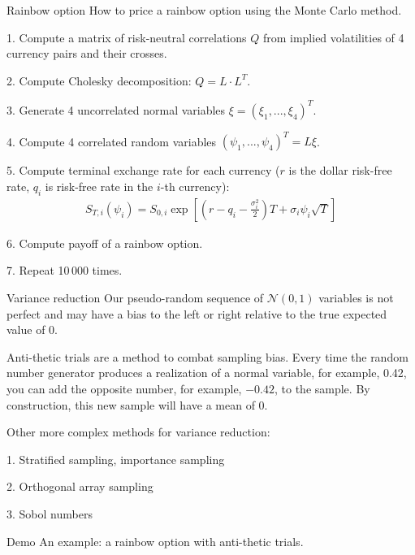 \documentclass{beamer}
\begin{document}
\begin{frame}{Rainbow option}
\justify
How to price a rainbow option using the Monte Carlo method.

1. Compute a matrix of risk-neutral correlations $Q$ from implied volatilities of 4 currency pairs and their crosses.

2. Compute Cholesky decomposition: $Q = L \cdot L^T$.

3. Generate 4 uncorrelated normal variables $\xi = (\xi_1,...,\xi_4)^T$.

4. Compute 4 correlated random variables $(\psi_1,...,\psi_4)^T = L\xi$.

5. Compute terminal exchange rate for each currency  ($r$ is the dollar risk-free rate, $q_i$ is risk-free rate in the $i$-th currency):
\begin{align*}
S_{T,i}(\psi_i) = S_{0,i}\exp\left[\left(r - q_i - \frac{\sigma_i^2}{2}\right)T + \sigma_i\psi_i\sqrt{T}\right]
\end{align*}

6. Compute payoff of a rainbow option.

7. Repeat 10\,000 times.
\end{frame}



\begin{frame}{Variance reduction}
\justify
Our pseudo-random sequence of $\mathcal{N}(0,1)$ variables is not perfect and may have a bias to the left or right relative to the true expected value of 0.

\justify
\alert{Anti-thetic trials} are a method to combat sampling bias. Every time the random number generator produces a realization of a normal variable, for example, 0.42, you can add the opposite number, for example, $-0.42$, to the sample. By construction, this new sample will have a mean of 0.

\justify
Other more complex methods for variance reduction:

1. Stratified sampling, importance sampling

2. Orthogonal array sampling

3. Sobol numbers
\end{frame}



\begin{frame}{Demo}
\justify
An example: a rainbow option with anti-thetic trials.
\end{frame}
\end{document}
